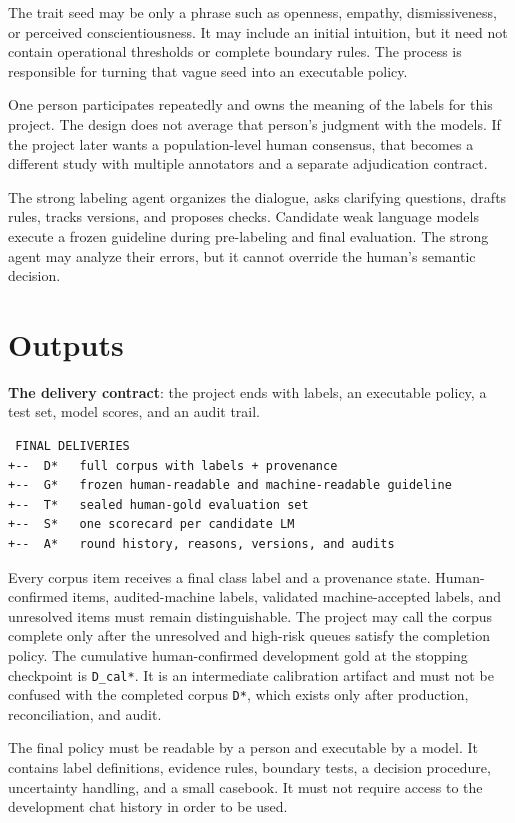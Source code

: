 The trait seed may be only a phrase such as openness, empathy, dismissiveness, or perceived conscientiousness. It may include an initial intuition, but it need not contain operational thresholds or complete boundary rules. The process is responsible for turning that vague seed into an executable policy.

One person participates repeatedly and owns the meaning of the labels for this project. The design does not average that person's judgment with the models. If the project later wants a population-level human consensus, that becomes a different study with multiple annotators and a separate adjudication contract.

The strong labeling agent organizes the dialogue, asks clarifying questions, drafts rules, tracks versions, and proposes checks. Candidate weak language models execute a frozen guideline during pre-labeling and final evaluation. The strong agent may analyze their errors, but it cannot override the human's semantic decision.


\section{Outputs}
\textbf{The delivery contract}: the project ends with labels, an executable policy, a test set, model scores, and an audit trail.

\begin{verbatim}
 FINAL DELIVERIES
+--  D*   full corpus with labels + provenance
+--  G*   frozen human-readable and machine-readable guideline
+--  T*   sealed human-gold evaluation set
+--  S*   one scorecard per candidate LM
+--  A*   round history, reasons, versions, and audits
\end{verbatim}
Every corpus item receives a final class label and a provenance state. Human-confirmed items, audited-machine labels, validated machine-accepted labels, and unresolved items must remain distinguishable. The project may call the corpus complete only after the unresolved and high-risk queues satisfy the completion policy. The cumulative human-confirmed development gold at the stopping checkpoint is \texttt{D\_cal*}. It is an intermediate calibration artifact and must not be confused with the completed corpus \texttt{D*}, which exists only after production, reconciliation, and audit.

The final policy must be readable by a person and executable by a model. It contains label definitions, evidence rules, boundary tests, a decision procedure, uncertainty handling, and a small casebook. It must not require access to the development chat history in order to be used.

